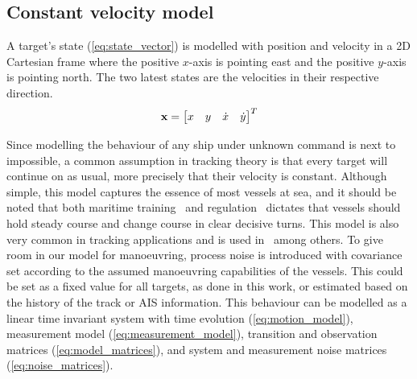 \subsection{Constant velocity model}
A target's state (\ref{eq:state_vector}) is modelled with position and velocity in a 2D Cartesian frame where the positive \(x\)-axis is pointing east and the positive \(y\)-axis is pointing north. The two latest states are the velocities in their respective direction.
\begin{equation}
\boldsymbol{\mathbf{x}} = \begin{bmatrix}
x & y & \dot{x} & \dot{y}
\end{bmatrix}^T
\label{eq:state_vector}
\end{equation}

Since modelling the behaviour of any ship under unknown command is next to impossible, a common assumption in tracking theory is that every target will continue on as usual, more precisely that their velocity is constant. Although simple, this model captures the essence of most vessels at sea, and it should be noted that both maritime training~\cite{Allen2005} and regulation~\cite{IMO1972} dictates that vessels should hold steady course and change course in clear decisive turns. This model is also very common in tracking applications and is used in~\cite{Reid1979,Coraluppi2000,Brekke2012,Wilthil,Vo2015,Chen2003,Habtemariam2015} among others. To give room in our model for manoeuvring, process noise is introduced with covariance set according to the assumed manoeuvring capabilities of the vessels. This could be set as a fixed value for all targets, as done in this work, or estimated based on the history of the track or AIS information. This behaviour can be modelled as a linear time invariant system with time evolution (\ref{eq:motion_model}), measurement model (\ref{eq:measurement_model}), transition and observation matrices (\ref{eq:model_matrices}), and system and measurement noise matrices (\ref{eq:noise_matrices}).

